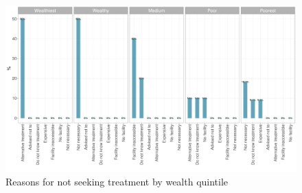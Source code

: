 \documentclass[12pt,a4paper]{article}
\begin{document}
\begin{figure}[H]

{\centering \includegraphics{kayinReport_files/figure-latex/ari4plot-1} 

}

\caption{Reasons for not seeking treatment by wealth quintile}\label{fig:ari4plot}
\end{figure}
\end{document}
